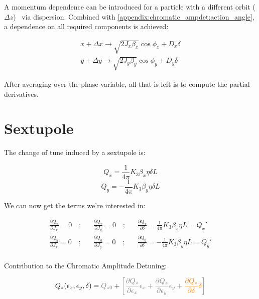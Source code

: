 A momentum dependence can be introduced for a particle with a different orbit
($\Delta z$)~\cite{wiedemann_particle_1999} via dispersion. Combined with
\cref{appendix:chromatic_ampdet:action_angle}, a dependence on all required components is achieved:

\begin{equation}
  \begin{aligned}
    x + \Delta x \rightarrow \sqrt{2J_x \beta_x} \cos{\phi_x} + D_x \delta \\
    y + \Delta y \rightarrow \sqrt{2J_y \beta_y} \cos{\phi_y} + D_y \delta
  \end{aligned}
\end{equation}


After averaging over the phase variable, all that is left is to compute the partial derivatives.


\section{Sextupole}

The change of tune induced by a sextupole is:

\begin{equation}Q_x = \frac{1}{4\pi} K_3 \beta_x \eta \delta L\end{equation}
\begin{equation}Q_y = - \frac{1}{4\pi} K_3 \beta_y \eta \delta L\end{equation}

We can now get the terms we're interested in:

\begin{equation}\begin{aligned}
\frac{\partial Q_x}{\partial J_x} = 0 \quad;&& \frac{\partial Q_x}{\partial J_y} = 0 \quad;&& \frac{\partial Q_x}{\partial \delta} = \frac{1}{4\pi}K_3\beta_x\eta L = Q_x'\\
\frac{\partial Q_y}{\partial J_x} = 0 \quad;&& \frac{\partial Q_y}{\partial J_y} = 0 \quad;&& \frac{\partial Q_y}{\partial \delta} = -\frac{1}{4\pi}K_3\beta_y\eta L = Q_y'\\
\end{aligned}\end{equation}

Contribution to the Chromatic Amplitude Detuning:

\begin{equation}
\begin{aligned}
Q_z(\epsilon_x, \epsilon_y, \delta) = \color{gray}Q_{z0} &+ \color{gray}\left[\frac{\partial Q_z}{\partial \epsilon_x} \epsilon_x
                                                 + \frac{\partial Q_z}{\partial \epsilon_y} \epsilon_y
                                                 + \textcolor{orange}{\frac{\partial Q_z}{\partial \delta} \delta}
                                                \right] \\
\end{aligned}
\end{equation}


